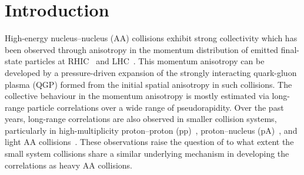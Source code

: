 
\section{Introduction}
\label{sec:intro}

High-energy nucleus--nucleus (AA) collisions exhibit strong collectivity which has been observed through anisotropy in the momentum distribution of emitted final-state particles at RHIC~\cite{Adams:2005dq,Adcox:2004mh,Arsene:2004fa,Back:2004je} and LHC~\cite{Abelev:2012di, Abelev:2014pua, ATLAS:2011ah}. This momentum anisotropy can be developed by a pressure-driven expansion of the strongly interacting quark-gluon plasma (QGP) formed from the initial spatial anisotropy in such collisions.
The collective behaviour in the momentum anisotropy is mostly estimated via long-range particle correlations over a wide range of pseudorapidity. Over the past years, long-range correlations are also observed in smaller collision systems, particularly in high-multiplicity proton--proton (pp)~\cite{ATLAS:2015hzw,Khachatryan:2015lva,Khachatryan:2016txc,Acharya:2019vdf,ATLAS:2017rtr}, proton--nucleus (pA)~\cite{ALICE:2012eyl,ATLAS:2014qaj,ATLAS:2016yzd,Khachatryan:2016ibd}, and light AA collisions~\cite{PHENIX:2018lia,Aidala:2017ajz}. These observations raise the question of to what extent the small system collisions share a similar underlying mechanism in developing the correlations as heavy AA collisions.

